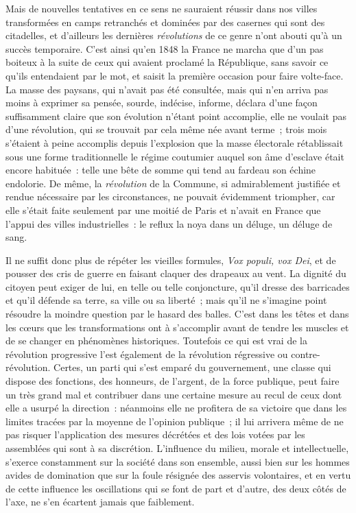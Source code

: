 \documentclass[french,twoside]{book} %
\begin{document}
Mais de nouvelles tentatives en ce sens ne sauraient réussir dans nos villes transformées en camps retranchés et dominées par des casernes qui sont des citadelles, et d’ailleurs les dernières \emph{révolutions} de ce genre n’ont abouti qu’à un succès temporaire. C’est ainsi qu’en 1848 la France ne marcha que d’un pas boiteux à la suite de ceux qui avaient proclamé la République, sans savoir ce qu’ils entendaient par le mot, et saisit la première occasion pour faire volte-face. La masse des paysans, qui n’avait pas été consultée, mais qui n’en arriva pas moins à exprimer sa pensée, sourde, indécise, informe, déclara d’une façon suffisamment claire que son évolution  n’étant point accomplie, elle ne voulait pas d’une révolution, qui se trouvait par cela même née avant terme ; trois mois s’étaient à peine accomplis depuis l’explosion que la masse électorale rétablissait sous une forme traditionnelle le régime coutumier auquel son âme d’esclave était encore habituée : telle une bête de somme qui tend au fardeau son échine endolorie. De même, la \emph{révolution} de la Commune, si admirablement justifiée et rendue nécessaire par les circonstances, ne pouvait évidemment triompher, car elle s’était faite seulement par une moitié de Paris et n’avait en France que l’appui des villes industrielles : le reflux la noya dans un déluge, un déluge de sang.\par
Il ne suffit donc plus de répéter les  vieilles formules, \emph{Vox populi, vox Dei}, et de pousser des cris de guerre en faisant claquer des drapeaux au vent. La dignité du citoyen peut exiger de lui, en telle ou telle conjoncture, qu’il dresse des barricades et qu’il défende sa terre, sa ville ou sa liberté ; mais qu’il ne s’imagine point résoudre la moindre question par le hasard des balles. C’est dans les têtes et dans les cœurs que les transformations ont à s’accomplir avant de tendre les muscles et de se changer en phénomènes historiques. Toutefois ce qui est vrai de la révolution progressive l’est également de la révolution régressive ou contre-révolution. Certes, un parti qui s’est emparé du gouvernement, une classe qui dispose des fonctions, des honneurs, de l’argent, de la force publique,  peut faire un très grand mal et contribuer dans une certaine mesure au recul de ceux dont elle a usurpé la direction : néanmoins elle ne profitera de sa victoire que dans les limites tracées par la moyenne de l’opinion publique ; il lui arrivera même de ne pas risquer l’application des mesures décrétées et des lois votées par les assemblées qui sont à sa discrétion. L’influence du milieu, morale et intellectuelle, s’exerce constamment sur la société dans son ensemble, aussi bien sur les hommes avides de domination que sur la foule résignée des asservis volontaires, et en vertu de cette influence les oscillations qui se font de part et d’autre, des deux côtés de l’axe, ne s’en écartent jamais que faiblement.\par
\end{document}
